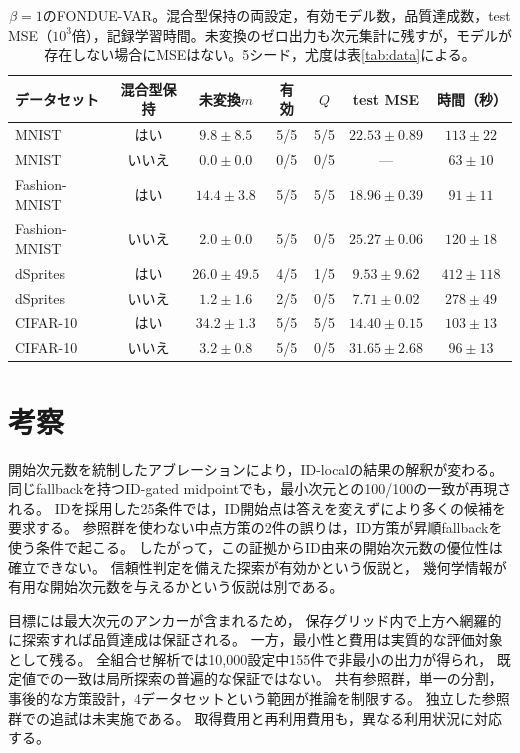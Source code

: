 \documentclass[11pt,a4paper]{ltjsarticle}
\begin{document}
\begin{table}[H]
\caption{$\beta=1$のFONDUE-VAR。混合型保持の両設定，有効モデル数，品質達成数，test MSE（$10^3$倍），記録学習時間。未変換のゼロ出力も次元集計に残すが，モデルが存在しない場合にMSEはない。5シード，尤度は表\ref{tab:data}による。}\label{tab:var}
\footnotesize
\setlength{\tabcolsep}{3.5pt}
\begin{tabular*}{\textwidth}{@{\extracolsep{\fill}}lcccccc@{}}
\toprule
データセット & 混合型保持 & 未変換$m$ & 有効 & $Q$ & test MSE & 時間（秒） \\
\midrule
MNIST & はい & $9.8 \pm 8.5$ & 5/5 & 5/5 & $22.53 \pm 0.89$ & $113 \pm 22$ \\
MNIST & いいえ & $0.0 \pm 0.0$ & 0/5 & 0/5 & --- & $63 \pm 10$ \\
Fashion-MNIST & はい & $14.4 \pm 3.8$ & 5/5 & 5/5 & $18.96 \pm 0.39$ & $91 \pm 11$ \\
Fashion-MNIST & いいえ & $2.0 \pm 0.0$ & 5/5 & 0/5 & $25.27 \pm 0.06$ & $120 \pm 18$ \\
dSprites & はい & $26.0 \pm 49.5$ & 4/5 & 1/5 & $9.53 \pm 9.62$ & $412 \pm 118$ \\
dSprites & いいえ & $1.2 \pm 1.6$ & 2/5 & 0/5 & $7.71 \pm 0.02$ & $278 \pm 49$ \\
CIFAR-10 & はい & $34.2 \pm 1.3$ & 5/5 & 5/5 & $14.40 \pm 0.15$ & $103 \pm 13$ \\
CIFAR-10 & いいえ & $3.2 \pm 0.8$ & 5/5 & 0/5 & $31.65 \pm 2.68$ & $96 \pm 13$ \\
\bottomrule
\end{tabular*}
\end{table}

\section{考察}\label{sec:discussion}
開始次元数を統制したアブレーションにより，ID-localの結果の解釈が変わる。
同じfallbackを持つID-gated midpointでも，最小次元との100/100の一致が再現される。
IDを採用した25条件では，ID開始点は答えを変えずにより多くの候補を要求する。
参照群を使わない中点方策の2件の誤りは，ID方策が昇順fallbackを使う条件で起こる。
したがって，この証拠からID由来の開始次元数の優位性は確立できない。
信頼性判定を備えた探索が有効かという仮説と，
幾何学情報が有用な開始次元数を与えるかという仮説は別である。

目標には最大次元のアンカーが含まれるため，
保存グリッド内で上方へ網羅的に探索すれば品質達成は保証される。
一方，最小性と費用は実質的な評価対象として残る。
全組合せ解析では10,000設定中155件で非最小の出力が得られ，
既定値での一致は局所探索の普遍的な保証ではない。
共有参照群，単一の分割，事後的な方策設計，4データセットという範囲が推論を制限する。
独立した参照群での追試は未実施である。
取得費用と再利用費用も，異なる利用状況に対応する。
\end{document}
